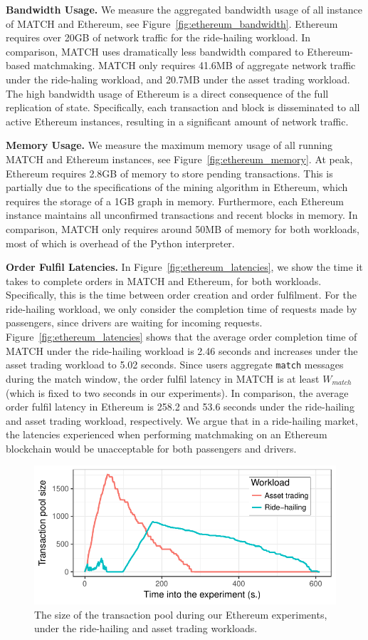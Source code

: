 \textbf{Bandwidth Usage.}
We measure the aggregated bandwidth usage of all instance of MATCH and Ethereum, see Figure~\ref{fig:ethereum_bandwidth}.
Ethereum requires over 20GB of network traffic for the ride-hailing workload.
In comparison, MATCH uses dramatically less bandwidth compared to Ethereum-based matchmaking.
MATCH only requires 41.6MB of aggregate network traffic under the ride-haling workload, and 20.7MB under the asset trading workload.
The high bandwidth usage of Ethereum is a direct consequence of the full replication of state.
Specifically, each transaction and block is disseminated to all active Ethereum instances, resulting in a significant amount of network traffic.

\textbf{Memory Usage.}
We measure the maximum memory usage of all running MATCH and Ethereum instances, see Figure~\ref{fig:ethereum_memory}.
At peak, Ethereum requires 2.8GB of memory to store pending transactions.
This is partially due to the specifications of the mining algorithm in Ethereum, which requires the storage of a 1GB graph in memory.
Furthermore, each Ethereum instance maintains all unconfirmed transactions and recent blocks in memory.
In comparison, MATCH only requires around 50MB of memory for both workloads, most of which is overhead of the Python interpreter.

\textbf{Order Fulfil Latencies.}
In Figure~\ref{fig:ethereum_latencies}, we show the time it takes to complete orders in MATCH and Ethereum, for both workloads.
Specifically, this is the time between order creation and order fulfilment.
For the ride-hailing workload, we only consider the completion time of requests made by passengers, since drivers are waiting for incoming requests.
Figure~\ref{fig:ethereum_latencies} shows that the average order completion time of MATCH under the ride-hailing workload is 2.46 seconds and increases under the asset trading workload to 5.02 seconds.
Since users aggregate \texttt{match} messages during the match window, the order fulfil latency in MATCH is at least $ W_{match} $ (which is fixed to two seconds in our experiments).
In comparison, the average order fulfil latency in Ethereum is 258.2 and 53.6 seconds under the ride-hailing and asset trading workload, respectively.
We argue that in a ride-hailing market, the latencies experienced when performing matchmaking on an Ethereum blockchain would be unacceptable for both passengers and drivers.

\begin{figure}[t]
	\centering
	\includegraphics[width=.8\linewidth]{match/assets/plots/tx_pool}
	\caption{The size of the transaction pool during our Ethereum experiments, under the ride-hailing and asset trading workloads.}
	\label{fig:ethereum_tx_pool}
\end{figure}

